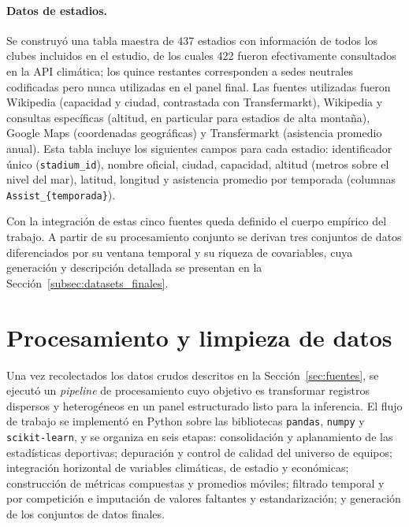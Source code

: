 \paragraph{Datos de estadios.} Se construy\'o una tabla maestra de 437 estadios con informaci\'on de todos los clubes incluidos en el estudio, de los cuales 422 fueron efectivamente consultados en la API clim\'atica; los quince restantes corresponden a sedes neutrales codificadas pero nunca utilizadas en el panel final. Las fuentes utilizadas fueron Wikipedia (capacidad y ciudad, contrastada con Transfermarkt), Wikipedia y consultas espec\'ificas (altitud, en particular para estadios de alta monta\~na), Google Maps (coordenadas geogr\'aficas) y Transfermarkt \cite{Transfermarkt} (asistencia promedio anual). Esta tabla incluye los siguientes campos para cada estadio: identificador \'unico (\texttt{stadium\_id}), nombre oficial, ciudad, capacidad, altitud (metros sobre el nivel del mar), latitud, longitud y asistencia promedio por temporada (columnas \texttt{Assist\_\{temporada\}}).

Con la integraci\'on de estas cinco fuentes queda definido el cuerpo emp\'irico del trabajo. A partir de su procesamiento conjunto se derivan tres conjuntos de datos diferenciados por su ventana temporal y su riqueza de covariables, cuya generaci\'on y descripci\'on detallada se presentan en la Secci\'on~\ref{subsec:datasets_finales}.


\section{Procesamiento y limpieza de datos}
\label{sec:procesamiento}

Una vez recolectados los datos crudos descritos en la Secci\'on~\ref{sec:fuentes}, se ejecut\'o un \textit{pipeline} de procesamiento cuyo objetivo es transformar registros dispersos y heterog\'eneos en un panel estructurado listo para la inferencia. El flujo de trabajo se implement\'o en Python sobre las bibliotecas \texttt{pandas}, \texttt{numpy} y \texttt{scikit-learn}, y se organiza en seis etapas: consolidaci\'on y aplanamiento de las estad\'isticas deportivas; depuraci\'on y control de calidad del universo de equipos; integraci\'on horizontal de variables clim\'aticas, de estadio y econ\'omicas; construcci\'on de m\'etricas compuestas y promedios m\'oviles; filtrado temporal y por competici\'on e imputaci\'on de valores faltantes y estandarizaci\'on; y generaci\'on de los conjuntos de datos finales.


